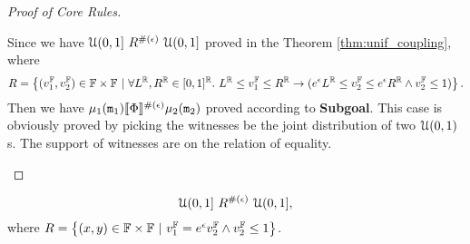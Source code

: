\documentclass[a4paper,11pt]{article}
\begin{document}
\begin{proof}[Proof of Core Rules]
\begin{itemize}
	Since we have $\mathcal{U}(0,1] ~ R^{\#(\epsilon)} ~ \mathcal{U}(0,1]$ proved in the Theorem \ref{thm:unif_coupling},
	where 
	\[
		R = 
		\left \{(v^{\mathbb{F}}_1, v^{\mathbb{F}}_2) \in \mathbb{F} \times \mathbb{F} 
		~|~
		\forall L^{\mathbb{R}}, R^{\mathbb{R}} \in [0,1]^{\mathbb{R}}. ~
		L^{\mathbb{R}} \leq v^{\mathbb{F}}_1 \leq R^{\mathbb{R}}
		\rightarrow
		(e^{\epsilon} L^{\mathbb{R}} \leq v^{\mathbb{F}}_2 \leq 	e^{\epsilon} R^{\mathbb{R}}
		\land v^{\mathbb{F}}_2 \leq 1)
		\right \}.
	\]	%
	Then we have $\mu_1(\mathtt{m}_1) \llbracket \Phi \rrbracket^{\#(\epsilon)} \mu_2(\mathtt{m}_2)$ proved according to \textbf{Subgoal}.
	\caseL{[\textsc{Null}] }
	This case is obviously proved by picking the witnesses be the joint distribution of two $\mathcal{U}(0, 1)$s.
	The support of witnesses are on the relation of equality.
	\end{itemize}
\end{proof}
%
\newpage
\begin{thm}
\label{thm:unif_coupling}
%
$${\mathcal{U}(0,1]} ~ R^{\#(\epsilon)} ~ {\mathcal{U}(0,1]},$$
%
where
	$	R = 
		\left \{(\varx, \vary) \in {\float} \times {\float} 
		~|~
		\fval_1  = e^{\epsilon}  \fval_2 
		\land \fval_2 
		\right \}
		$.
\end{thm}
%
\end{document}
